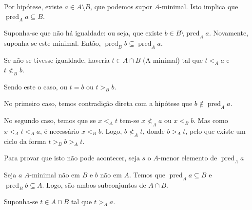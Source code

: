 \documentclass{article}
\DeclareMathOperator{\pred}{pred}
\begin{document}
	Por hipótese, existe $a \in A \setminus B$, que podemos supor $A$-minimal. Isto implica que $\pred_A a \subseteq B$.
	
	Suponha-se que não há igualdade: ou seja, que existe $b \in B \setminus \pred_A a$. Novamente, suponha-se este minimal. Então, $\pred_B b \subseteq \pred_A a$.
	
	Se não se tivesse igualdade, haveria $t \in A \cap B$ (A-minimal) tal que $t <_A a$ e $t \not <_B b$.
	
	Sendo este o caso, ou $t = b$ ou $t >_B b$.
	
	No primeiro caso, temos contradição direta com a hipótese que $b \not \in \pred_A a$.
	
	No segundo caso, temos que se $x <_A t$ tem-se $x \not <_A a$ ou $x <_B b$. Mas como $x <_A t <_A a$, é necessário $x <_B b$. Logo, $b \not <_A t$, donde $b >_A t$, pelo que existe um ciclo da forma $t >_B b >_A t$.
	
	Para provar que isto não pode acontecer, seja $s$ o $A$-menor elemento de $\pred_A a$
	
	Seja $a$ $A$-minimal não em $B$ e $b$ não em $A$. Temos que $\pred_A a \subseteq B$ e $\pred_B b \subseteq A$. Logo, são ambos subconjuntos de $A \cap B$.
	
	Suponha-se $t \in A \cap B$ tal que $t >_A a$.
	
\end{document}
